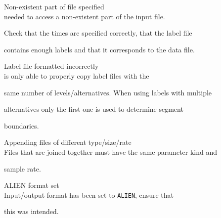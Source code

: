 \begin{itemize}










\begin{itemize}


    Non-existent part of file specified\\


         needed to access a non-existent part of the input file.


        Check that the times are specified correctly, that the label file


        contains enough labels and that it corresponds to the data file.





 Label file formatted incorrectly\\


         is only able to properly copy label files with the


        same number of levels/alternatives.  When using labels with multiple


        alternatives only the first one is used to determine segment 


        boundaries.





    Appending files of different type/size/rate\\


        Files that are joined together must have the same parameter kind and 


        sample rate.





    ALIEN format set\\


        Input/output format has been set to \texttt{ALIEN}, ensure that 


        this was intended.





\end{itemize}











\end{itemize}
